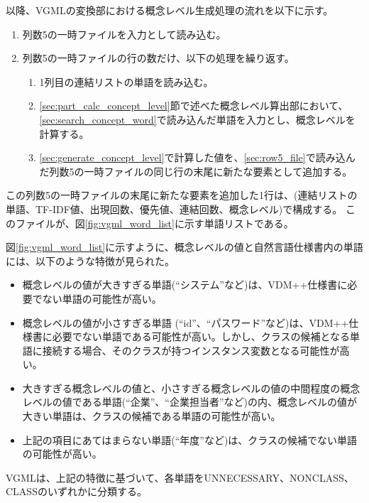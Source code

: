以降、VGMLの変換部における概念レベル生成処理の流れを以下に示す。

\begin{enumerate}
    \item 列数5の一時ファイルを入力として読み込む。
    \label{sec:row5_file}
    \item 列数5の一時ファイルの行の数だけ、以下の処理を繰り返す。
        \begin{enumerate}
            \item 1列目の連結リストの単語を読み込む。
            \label{sec:search_concept_word}
            \item \ref{sec:part_calc_concept_level}節で述べた概念レベル算出部において、\ref{sec:search_concept_word}で読み込んだ単語を入力とし、概念レベルを計算する。
            \label{sec:generate_concept_level}
            \item \ref{sec:generate_concept_level}で計算した値を、\ref{sec:row5_file}で読み込んだ列数5の一時ファイルの同じ行の末尾に新たな要素として追加する。
        \end{enumerate}
\end{enumerate}

この列数5の一時ファイルの末尾に新たな要素を追加した1行は、(連結リストの単語、TF-IDF値、出現回数、優先値、連結回数、概念レベル)で構成する。
このファイルが、図\ref{fig:vgml_word_list}に示す単語リストである。

図\ref{fig:vgml_word_list}に示すように、概念レベルの値と自然言語仕様書内の単語には、以下のような特徴が見られた。

\begin{itemize}
    \item 概念レベルの値が大きすぎる単語(``システム''など)は、VDM++仕様書に必要でない単語の可能性が高い。
    \item 概念レベルの値が小さすぎる単語 (``id''、``パスワード''など)は、VDM++仕様書に必要でない単語である可能性が高い。しかし、クラスの候補となる単語に接続する場合、そのクラスが持つインスタンス変数となる可能性が高い。
    \item 大きすぎる概念レベルの値と、小さすぎる概念レベルの値の中間程度の概念レベルの値である単語(``企業''、``企業担当者''など)の内、概念レベルの値が大きい単語は、クラスの候補である単語の可能性が高い。
    \item 上記の項目にあてはまらない単語(``年度''など)は、クラスの候補でない単語の可能性が高い。
\end{itemize}

VGMLは、上記の特徴に基づいて、各単語をUNNECESSARY、NONCLASS、CLASSのいずれかに分類する。

